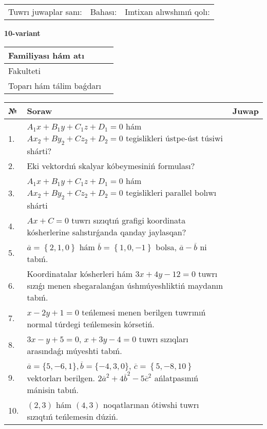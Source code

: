 \documentclass{article}
\begin{document}
\vspace{1cm}

\begin{tabular}{lll}
Tuwrı juwaplar sanı: \underline{\hspace{1.5cm}} & 
Bahası: \underline{\hspace{1.5cm}} & 
Imtixan alıwshınıń qolı: \underline{\hspace{2cm}} \\
\end{tabular}

\egroup

\newpage


\textbf{10-variant}\\

\bgroup
\def\arraystretch{1.6} %

\begin{tabular}{|m{5.7cm}|m{9.5cm}|}
\hline
Familiyası hám atı & \\
\hline
Fakulteti  & \\
\hline
Toparı hám tálim baǵdarı  & \\
\hline
\end{tabular}

\vspace{1cm}

\begin{tabular}{|m{0.7cm}|m{10cm}|m{4cm}|}
\hline
№ & Soraw & Juwap \\
\hline
1. & $A_1x+B_1y+C_1z+D_1=0$ hám $Ax_2+By_2+Cz_2+D_2=0$ tegislikleri ústpe-úst túsiwi shárti? &  \\
\hline
2. & Eki vektordıń skalyar kóbeymesiniń formulası? &  \\
\hline
3. & $A_1x+B_1y+C_1z+D_1=0$ hám $Ax_2+By_2+Cz_2+D_2=0$ tegislikleri parallel bolıwı shárti &  \\
\hline
4. & $Ax+C=0$ tuwrı sızıqtıń grafigi koordinata kósherlerine salıstırǵanda qanday jaylasqan? &  \\
\hline
5. & $\overline{a}=\left\{ 2, 1, 0 \right\}$ hám $\overline{b}=\left\{ 1, 0,-1 \right\}$ bolsa, $\overline{a}-\overline{b}$ ni tabıń. &  \\
\hline
6. & Koordinatalar kósherleri hám $ 3x+4y-12=0 $ tuwrı sızıǵı menen shegaralanǵan úshmúyeshliktiń maydanın tabıń. &  \\
\hline
7. & $x-2y+1=0$ teńlemesi menen berilgen tuwrınıń normal túrdegi teńlemesin kórsetiń. &  \\
\hline
8. & $3x-y+5=0$, $x+3y-4=0$ tuwrı sızıqları arasındaǵı múyeshti tabıń. &  \\
\hline
9. & $\overline{a}=\{5,-6, 1 \}, \overline{b}=\{-4, 3, 0 \} $, $\overline{c}=\left\{ 5,-8, 10 \right\}$ vektorları berilgen. $2{\overline{a}}^{2}+4{\overline{b}}^{2}-5{\overline{c}}^{2}$ ańlatpasınıń mánisin tabıń. &  \\
\hline
10. & $(2, 3)$ hám $(4, 3)$ noqatlarınan ótiwshi tuwrı sızıqtıń teńlemesin dúziń. &  \\
\hline
\end{tabular}
\end{document}
